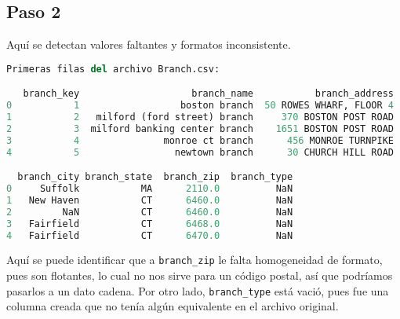 \vspace{1.5 cm}

\subsection*{Paso 2}

Aquí se detectan valores faltantes y formatos inconsistente.

\vspace{0.5 cm}



\vspace{0.5 cm}

\begin{lstlisting}[language = Python, caption = {Información de los datos.}]
Primeras filas del archivo Branch.csv:

   branch_key                    branch_name           branch_address  \
0           1                  boston branch  50 ROWES WHARF, FLOOR 4   
1           2   milford (ford street) branch     370 BOSTON POST ROAD   
2           3  milford banking center branch    1651 BOSTON POST ROAD   
3           4               monroe ct branch      456 MONROE TURNPIKE   
4           5                 newtown branch      30 CHURCH HILL ROAD   

  branch_city branch_state  branch_zip  branch_type  
0     Suffolk           MA      2110.0          NaN  
1   New Haven           CT      6460.0          NaN  
2         NaN           CT      6460.0          NaN  
3   Fairfield           CT      6468.0          NaN  
4   Fairfield           CT      6470.0          NaN  
\end{lstlisting}

\vspace{0.5 cm}

Aquí se puede identificar que a \texttt{branch\_zip} le falta 
homogeneidad de formato, pues son flotantes, lo cual no nos 
sirve para un código postal, así que podríamos pasarlos a un 
dato cadena. Por otro lado, \texttt{branch\_type} está vació, 
pues fue una columna creada que no tenía algún equivalente 
en el archivo original. 

\vspace{0.5 cm}

